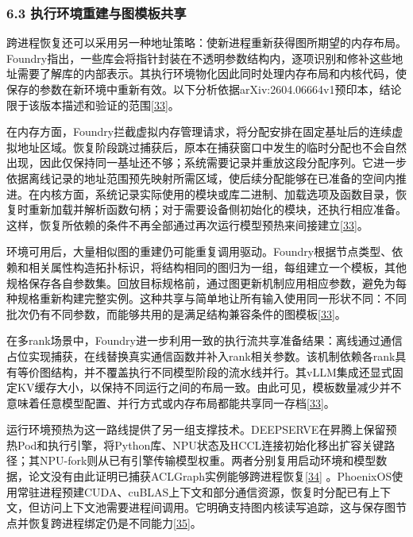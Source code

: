 \documentclass[UTF8,11pt,fontset=windows]{ctexart}
\begin{document}
\hypertarget{section-6-3}{%
\subsubsection{\texorpdfstring{\textbf{6.3 执行环境重建与图模板共享}}{6.3 执行环境重建与图模板共享}}\label{section-6-3}}

跨进程恢复还可以采用另一种地址策略：使新进程重新获得图所期望的内存布局。Foundry指出，一些库会将指针封装在不透明参数结构内，逐项识别和修补这些地址需要了解库的内部表示。其执行环境物化因此同时处理内存布局和内核代码，使保存的参数在新环境中重新有效。以下分析依据arXiv:2604.06664v1预印本，结论限于该版本描述和验证的范围\protect\hyperlink{ref-33}{{[}33{]}}。

在内存方面，Foundry拦截虚拟内存管理请求，将分配安排在固定基址后的连续虚拟地址区域。恢复阶段跳过捕获后，原本在捕获窗口中发生的临时分配也不会自然出现，因此仅保持同一基址还不够；系统需要记录并重放这段分配序列。它进一步依据离线记录的地址范围预先映射所需区域，使后续分配能够在已准备的空间内推进。在内核方面，系统记录实际使用的模块或库二进制、加载选项及函数目录，恢复时重新加载并解析函数句柄；对于需要设备侧初始化的模块，还执行相应准备。这样，恢复所依赖的条件不再全部通过再次运行模型预热来间接建立\protect\hyperlink{ref-33}{{[}33{]}}。

环境可用后，大量相似图的重建仍可能重复调用驱动。Foundry根据节点类型、依赖和相关属性构造拓扑标识，将结构相同的图归为一组，每组建立一个模板，其他规格保存各自参数集。回放目标规格前，通过图更新机制应用相应参数，避免为每种规格重新构建完整实例。这种共享与简单地让所有输入使用同一形状不同：不同批次仍有不同参数，而能够共用的是满足结构兼容条件的图模板\protect\hyperlink{ref-33}{{[}33{]}}。

在多rank场景中，Foundry进一步利用一致的执行流共享准备结果：离线通过通信占位实现捕获，在线替换真实通信函数并补入rank相关参数。该机制依赖各rank具有等价图结构，并不覆盖执行不同模型阶段的流水线并行。其vLLM集成还显式固定KV缓存大小，以保持不同运行之间的布局一致。由此可见，模板数量减少并不意味着任意模型配置、并行方式或内存布局都能共享同一存档\protect\hyperlink{ref-33}{{[}33{]}}。

运行环境预热为这一路线提供了另一组支撑技术。DEEPSERVE在昇腾上保留预热Pod和执行引擎，将Python库、NPU状态及HCCL连接初始化移出扩容关键路径；其NPU-fork则从已有引擎传输模型权重。两者分别复用启动环境和模型数据，论文没有由此证明已捕获ACLGraph实例能够跨进程恢复\protect\hyperlink{ref-34}{{[}34{]}} 。PhoenixOS使用常驻进程预建CUDA、cuBLAS上下文和部分通信资源，恢复时分配已有上下文，但访问上下文池需要进程间调用。它明确支持图内核读写追踪，这与保存图节点并恢复跨进程绑定仍是不同能力\protect\hyperlink{ref-35}{{[}35{]}}。
\end{document}
